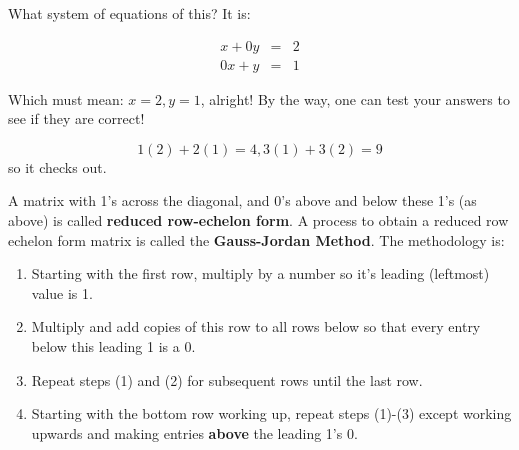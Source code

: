 What system of equations of this?  It is:

\begin{eqnarray*}
x+0y&=&2\\
0x+y&=&1
\end{eqnarray*}

Which must mean: $x=2, y=1$, alright!  By the way, one can test your answers to see if they are correct!

$$1(2)+2(1)=4, 3(1)+3(2)=9$$ so it checks out.

A matrix with 1's across the diagonal, and 0's above and below these 1's (as above) is called \textbf{reduced row-echelon form}.  A process to obtain a reduced row echelon form matrix  is called the \textbf{Gauss-Jordan Method}.  The methodology is:

\begin{enumerate}
    \item Starting with the first row, multiply by a number so it's leading (leftmost) value is 1.
    \item Multiply and add copies of this row to all rows below so that every entry below this leading 1 is a 0.
    \item Repeat steps (1) and (2) for subsequent rows until the last row.
    \item Starting with the bottom row working up, repeat steps (1)-(3) except working upwards and making entries \textbf{above} the leading 1's 0.
\end{enumerate}

